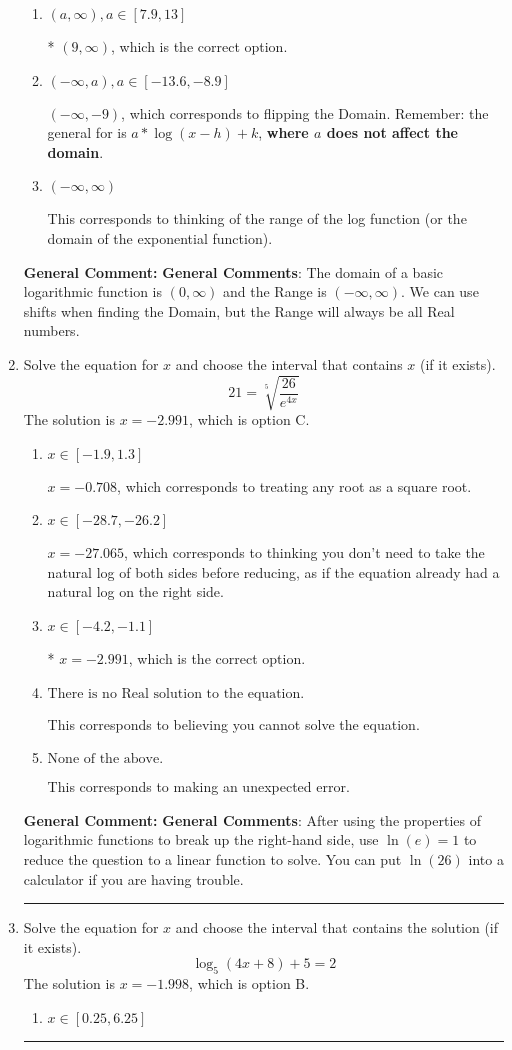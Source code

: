 \documentclass{extbook}[14pt]
\newcommand{\litem}[1]{\item #1

\rule{\textwidth}{0.4pt}}
\begin{document}
\begin{enumerate}
{\begin{enumerate}[label=\Alph*.]
$(-\infty, 3]$, which corresponds to using the negative vertical shift AND including the endpoint AND flipping the domain.
\item \( (a, \infty), a \in [7.9, 13] \)

* $(9, \infty)$, which is the correct option.
\item \( (-\infty, a), a \in [-13.6, -8.9] \)

$(-\infty, -9)$, which corresponds to flipping the Domain. Remember: the general for is $a*\log(x-h)+k$, \textbf{where $a$ does not affect the domain}.
\item \( (-\infty, \infty) \)

This corresponds to thinking of the range of the log function (or the domain of the exponential function).
\end{enumerate}

\textbf{General Comment:} \textbf{General Comments}: The domain of a basic logarithmic function is $(0, \infty)$ and the Range is $(-\infty, \infty)$. We can use shifts when finding the Domain, but the Range will always be all Real numbers.
}
\litem{
 Solve the equation for $x$ and choose the interval that contains $x$ (if it exists).
\[  21 = \sqrt[5]{\frac{26}{e^{4x}}} \]The solution is \( x = -2.991 \), which is option C.\begin{enumerate}[label=\Alph*.]
\item \( x \in [-1.9, 1.3] \)

$x = -0.708$, which corresponds to treating any root as a square root.
\item \( x \in [-28.7, -26.2] \)

$x = -27.065$, which corresponds to thinking you don't need to take the natural log of both sides before reducing, as if the equation already had a natural log on the right side.
\item \( x \in [-4.2, -1.1] \)

* $x = -2.991$, which is the correct option.
\item \( \text{There is no Real solution to the equation.} \)

This corresponds to believing you cannot solve the equation.
\item \( \text{None of the above.} \)

This corresponds to making an unexpected error.
\end{enumerate}

\textbf{General Comment:} \textbf{General Comments}: After using the properties of logarithmic functions to break up the right-hand side, use $\ln(e) = 1$ to reduce the question to a linear function to solve. You can put $\ln(26)$ into a calculator if you are having trouble.
}
\litem{
Solve the equation for $x$ and choose the interval that contains the solution (if it exists).
\[ \log_{5}{(4x+8)}+5 = 2 \]The solution is \( x = -1.998 \), which is option B.\begin{enumerate}[label=\Alph*.]
\item \( x \in [0.25, 6.25] \)


\end{enumerate}}
\end{enumerate}
\end{document}
